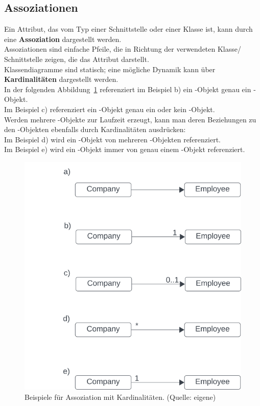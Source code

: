 \subsection{Assoziationen}

Ein Attribut, das vom Typ einer Schnittstelle oder einer Klasse ist, kann durch eine \textbf{Assoziation} dargestellt werden.\\

\noindent
Assoziationen sind einfache Pfeile, die in Richtung der verwendeten Klasse/ Schnittstelle zeigen, die das Attribut darstellt.\\

\noindent
Klassendiagramme sind statisch; eine mögliche Dynamik kann über \textbf{Kardinalitäten} dargestellt werden.\\
In der folgenden Abbildung~\ref{fig:association} referenziert im Beispiel b) ein -Objekt genau ein -Objekt.\\
Im Beispiel c) referenziert ein -Objekt genau ein oder kein -Objekt.\\


\noindent
Werden mehrere -Objekte zur Laufzeit erzeugt, kann man deren Beziehungen zu den -Objekten ebenfalls durch Kardinalitäten ausdrücken:\\
\noindent
Im Beispiel d) wird ein -Objekt von mehreren -Objekten referenziert.\\
\noindent
Im Beispiel e) wird ein -Objekt immer von genau einem -Objekt referenziert.

\begin{figure}
    \centering
    \includegraphics[scale=0.5]{chapters/fopt3/img/association}
    \caption{Beispiele für Assoziation mit Kardinalitäten. (Quelle: eigene)}
    \label{fig:association}
\end{figure}

